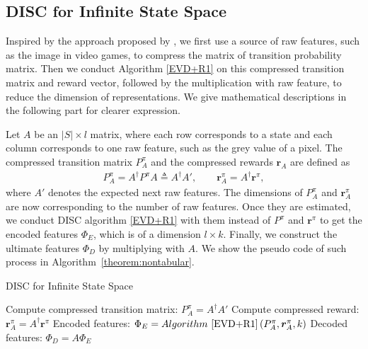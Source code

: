 \documentclass[onecolumn, conference]{IEEEtran}
\begin{document}
\subsection{DISC for Infinite State Space}
\label{sec:big scale}
Inspired by the approach proposed by \cite{Song2016LinearFE}\cite{Behzadian2019FeatureSB}, we first use a source of raw features, such as the image in video games, to compress the matrix of transition probability matrix. Then we conduct Algorithm \ref{EVD+R1} on this compressed transition matrix and reward vector, followed by the multiplication with raw feature, to reduce the dimension of representations. We give mathematical descriptions in the following part for clearer expression. 

Let $A$ be an $|S| \times l$ matrix, where each row corresponds to a state and each column corresponds to one raw feature, such as the grey value of a pixel. The compressed transition matrix $P^{\pi}_{A}$ and the compressed rewards $\boldsymbol{r}_A$ are defined as 
\begin{align*}
		P^{\pi}_A = A^{\dagger}P^\pi A \triangleq A^{\dagger} A' ,\quad\quad \boldsymbol{r}^{\pi}_A = A^{\dagger}\boldsymbol{r}^{\pi},
\end{align*}
where $A'$ denotes the expected next raw features. The dimensions of  $P^{\pi}_{A}$ and  $\boldsymbol{r}^{\pi}_A$ are now corresponding to the number of raw features. Once they are estimated, we conduct DISC algorithm \ref{EVD+R1} with them instead of  $P^{\pi}$ and $\boldsymbol{r}^{\pi}$ to get the encoded features $\Phi_{E}$, which is of a dimension $l \times k$. Finally, we construct the ultimate features $\Phi_D$ by multiplying with $A$. We show the pseudo code of such process in Algorithm~\ref{theorem:nontabular}.  

\begin{algorithm}[H]
        \caption{DISC for Infinite State Space}\label{EVD+R2}
        Compute compressed transition matrix: $P^{\pi}_A = A^\dagger A'$\;
        Compute compressed reward: $\boldsymbol{r}^{\pi}_A = A^\dagger \boldsymbol{r}^\pi$\;
        Encoded features: $\Phi_E = Algorithm~\ref{EVD+R1}\left(P^{\pi}_A, \boldsymbol{r}^{\pi}_A, k \right)${\color{blue} }
        Decoded features: $\Phi_D = A\Phi_E${\color{blue}}
\end{algorithm}
\end{document}
